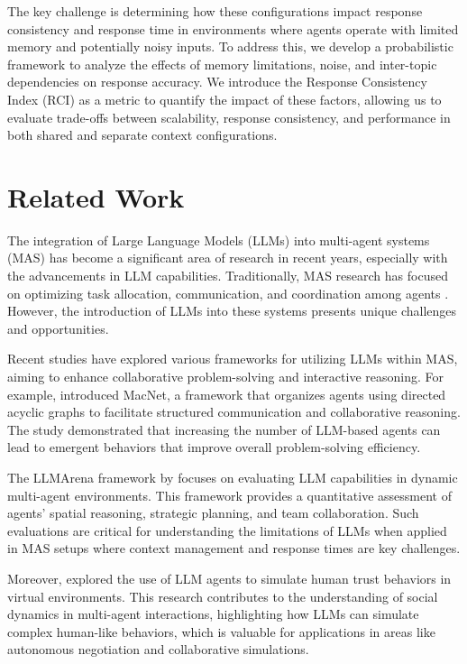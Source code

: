 \documentclass{article}
\begin{document}
The key challenge is determining how these configurations impact response consistency and response time in environments where agents operate with limited memory and potentially noisy inputs. To address this, we develop a probabilistic framework to analyze the effects of memory limitations, noise, and inter-topic dependencies on response accuracy. We introduce the Response Consistency Index (RCI) as a metric to quantify the impact of these factors, allowing us to evaluate trade-offs between scalability, response consistency, and performance in both shared and separate context configurations.

\section{Related Work}
\label{sec:related_work}

The integration of Large Language Models (LLMs) into multi-agent systems (MAS) has become a significant area of research in recent years, especially with the advancements in LLM capabilities. Traditionally, MAS research has focused on optimizing task allocation, communication, and coordination among agents \citep{wooldridge2009introduction, shehory1998methods, tambe1997towards}. However, the introduction of LLMs into these systems presents unique challenges and opportunities.

Recent studies have explored various frameworks for utilizing LLMs within MAS, aiming to enhance collaborative problem-solving and interactive reasoning. For example, \citet{qian2024macnet} introduced MacNet, a framework that organizes agents using directed acyclic graphs to facilitate structured communication and collaborative reasoning. The study demonstrated that increasing the number of LLM-based agents can lead to emergent behaviors that improve overall problem-solving efficiency.

The LLMArena framework by \citet{chen2024llmarena} focuses on evaluating LLM capabilities in dynamic multi-agent environments. This framework provides a quantitative assessment of agents' spatial reasoning, strategic planning, and team collaboration. Such evaluations are critical for understanding the limitations of LLMs when applied in MAS setups where context management and response times are key challenges.

Moreover, \citet{xie2024trustsim} explored the use of LLM agents to simulate human trust behaviors in virtual environments. This research contributes to the understanding of social dynamics in multi-agent interactions, highlighting how LLMs can simulate complex human-like behaviors, which is valuable for applications in areas like autonomous negotiation and collaborative simulations.
\end{document}
